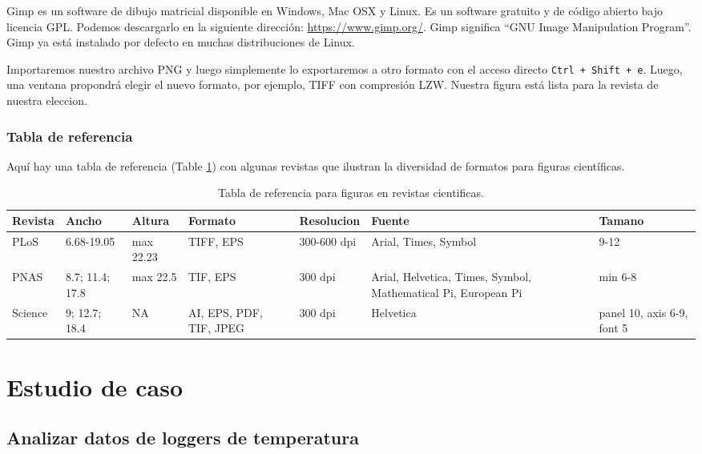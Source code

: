 \documentclass[
]{book}
\begin{document}
Gimp es un software de dibujo matricial disponible en Windows, Mac OSX y Linux. Es un software gratuito y de código abierto bajo licencia GPL. Podemos descargarlo en la siguiente dirección: \url{https://www.gimp.org/}. Gimp significa ``GNU Image Manipulation Program''. Gimp ya está instalado por defecto en muchas distribuciones de Linux.

Importaremos nuestro archivo PNG y luego simplemente lo exportaremos a otro formato con el acceso directo \texttt{Ctrl\ +\ Shift\ +\ e}. Luego, una ventana propondrá elegir el nuevo formato, por ejemplo, TIFF con compresión LZW. Nuestra figura está lista para la revista de nuestra eleccion.

\hypertarget{tabla-de-referencia}{%
\section{Tabla de referencia}\label{tabla-de-referencia}}

Aquí hay una tabla de referencia (Table \ref{tab:tabRefPub}) con algunas revistas que ilustran la diversidad de formatos para figuras científicas.

\begin{table}

\caption{\label{tab:tabRefPub}Tabla de referencia para figuras en revistas cientificas.\label{tab:tabRefPub}}
\centering
\begin{tabular}[t]{l|l|l|l|l|l|l}
\hline
Revista & Ancho & Altura & Formato & Resolucion & Fuente & Tamano\\
\hline
PLoS & 6.68-19.05 & max 22.23 & TIFF, EPS & 300-600 dpi & Arial, Times, Symbol & 9-12\\
\hline
PNAS & 8.7; 11.4; 17.8 & max 22.5 & TIF, EPS & 300 dpi & Arial, Helvetica, Times, Symbol, Mathematical Pi, European Pi & min 6-8\\
\hline
Science & 9; 12.7; 18.4 & NA & AI, EPS, PDF, TIF, JPEG & 300 dpi & Helvetica & panel 10, axis 6-9, font 5\\
\hline
\end{tabular}
\end{table}

\hypertarget{part-estudio-de-caso}{%
\part{Estudio de caso}\label{part-estudio-de-caso}}

\hypertarget{studyCase1}{%
\chapter{Analizar datos de loggers de temperatura}\label{studyCase1}}
\end{document}
